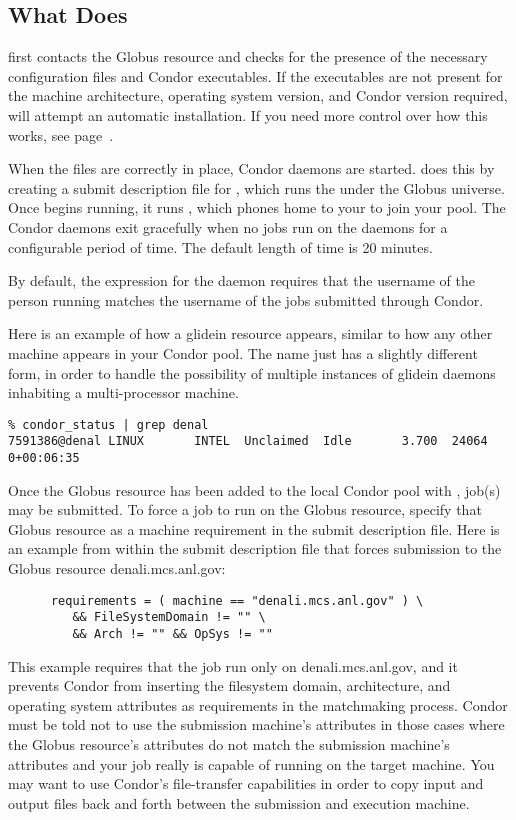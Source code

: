 \subsection{What  Does}

 first contacts the Globus resource and checks for the
presence of the necessary configuration files and Condor executables.
If the executables are not present for the machine architecture,
operating system version, and Condor version required,
 will attempt an automatic installation.  If you
need more control over how this works, see page~\pageref{man-condor-glidein}.

When the files are correctly in place,
Condor daemons are started.
 does this by creating a submit description file for
, which runs the  under the Globus
universe.
Once  begins running, it runs , which phones
home to your  to join your pool.
The Condor daemons exit gracefully when no jobs run on the daemons for a
configurable period of time. The default length of time is 20 minutes.

By default, the 
expression for the  daemon requires that the username
of the person running  matches the username of the jobs
submitted through Condor.

Here is an example of how a glidein resource appears, similar to how
any other machine appears in your Condor pool.  The name just has a
slightly different form, in order to handle the possibility of
multiple instances of glidein daemons inhabiting a multi-processor
machine.

\footnotesize
\begin{verbatim}
% condor_status | grep denal
7591386@denal LINUX       INTEL  Unclaimed  Idle       3.700  24064  0+00:06:35

\end{verbatim}
\normalsize

Once the Globus resource has been added to the local Condor
pool with ,
job(s) may be submitted.
To force a job to run on the Globus resource,
specify that Globus resource as a machine requirement
in the submit description file. 
Here is an example from within the submit description file
that forces submission to the Globus resource denali.mcs.anl.gov:
\begin{verbatim}
      requirements = ( machine == "denali.mcs.anl.gov" ) \
         && FileSystemDomain != "" \
         && Arch != "" && OpSys != ""
\end{verbatim}
This example requires that the job run only on denali.mcs.anl.gov,
and it prevents Condor from inserting the filesystem domain,
architecture, and operating system attributes as requirements
in the matchmaking process.
Condor must be told not to use the submission machine's
attributes in those cases
where the Globus resource's attributes
do not match the submission machine's attributes and your job
really is capable of running on the target machine.  You
may want to use Condor's file-transfer capabilities in order
to copy input and output files back and forth between the submission
and execution machine.

